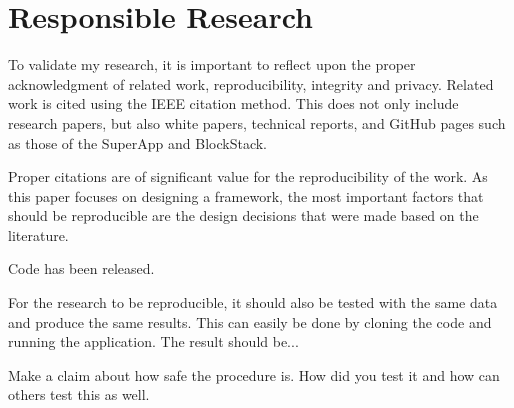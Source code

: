 \section{Responsible Research}
To validate my research, it is important to reflect upon the proper acknowledgment of related work, reproducibility, integrity and privacy. Related work is cited using the IEEE citation method. This does not only include research papers, but also white papers, technical reports, and GitHub pages such as those of the SuperApp and BlockStack. 

Proper citations are of significant value for the reproducibility of the work. As this paper focuses on designing a framework, the most important factors that should be reproducible are the design decisions that were made based on the literature. 

Code has been released.

For the research to be reproducible, it should also be tested with the same data and produce the same results. This can easily be done by cloning the code and running the application. The result should be...


Make a claim about how safe the procedure is. How did you test it and how can others test this as well. 